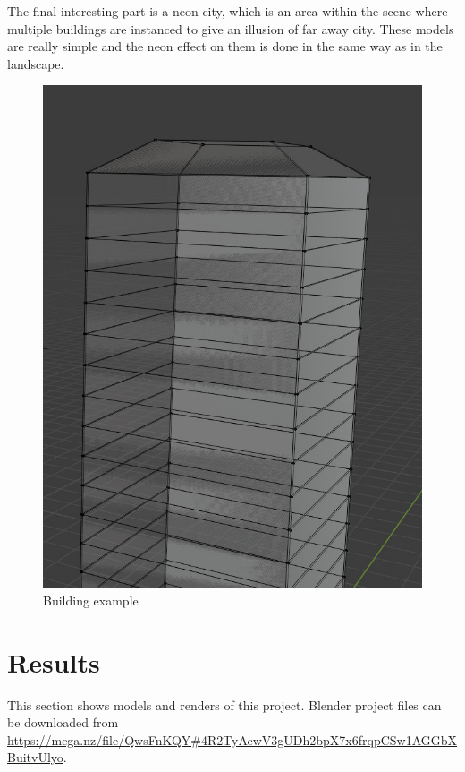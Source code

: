 \documentclass[12pt,a4paper,titlepage,final]{report}
\begin{document}
The final interesting part is a neon city, which is an area within the scene where multiple buildings are instanced to give an illusion of far away city. These models are really simple and the neon effect on them is done in the same way as in the landscape.
\begin{figure}[H]
    \centering
    \includegraphics{images/building_wire.jpg}
    \caption{Building example}
    \label{fig:building_example}
\end{figure}



\section{Results}
This section shows models and renders of this project. Blender project files can be downloaded from \url{https://mega.nz/file/QwsFnKQY#4R2TyAcwV3gUDh2bpX7x6frqpCSw1AGGbXBuitvUlyo}.
\end{document}
